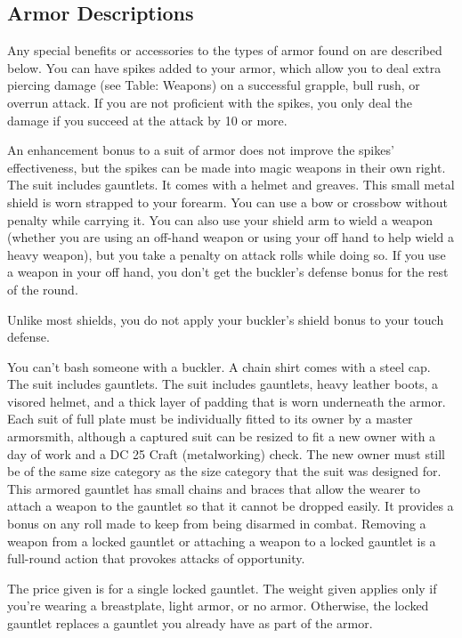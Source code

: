 \subsection{Armor Descriptions}
Any special benefits or accessories to the types of armor found on  are described below.
 You can have spikes added to your armor, which allow you to deal extra piercing damage (see Table: Weapons) on a successful grapple, bull rush, or overrun attack. If you are not proficient with the spikes, you only deal the damage if you succeed at the attack by 10 or more.
\par An enhancement bonus to a suit of armor does not improve the spikes' effectiveness, but the spikes can be made into magic weapons in their own right.
 The suit includes gauntlets.
 It comes with a helmet and greaves.
 This small metal shield is worn strapped to your forearm. You can use a bow or crossbow without penalty while carrying it. You can also use your shield arm to wield a weapon (whether you are using an off-hand weapon or using your off hand to help wield a heavy weapon), but you take a  penalty on attack rolls while doing so. If you use a weapon in your off hand, you don't get the buckler's defense bonus for the rest of the round.
\par Unlike most shields, you do not apply your buckler's shield bonus to your touch defense.
\par You can't bash someone with a buckler.
 A chain shirt comes with a steel cap.
 The suit includes gauntlets.
 The suit includes gauntlets, heavy leather boots, a visored helmet, and a thick layer of padding that is worn underneath the armor. Each suit of full plate must be individually fitted to its owner by a master armorsmith, although a captured suit can be resized to fit a new owner with a day of work and a DC 25 Craft (metalworking) check. The new owner must still be of the same size category as the size category that the suit was designed for.
 This armored gauntlet has small chains and braces that allow the wearer to attach a weapon to the gauntlet so that it cannot be dropped easily. It provides a  bonus on any roll made to keep from being disarmed in combat. Removing a weapon from a locked gauntlet or attaching a weapon to a locked gauntlet is a full-round action that provokes attacks of opportunity.
\par The price given is for a single locked gauntlet. The weight given applies only if you're wearing a breastplate, light armor, or no armor. Otherwise, the locked gauntlet replaces a gauntlet you already have as part of the armor.
